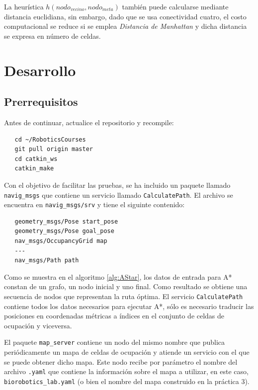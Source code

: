 \documentclass[letterpaper,12pt]{article}
\begin{document}
La heurística $h(nodo_{vecino}, nodo_{meta})$ también puede calcularse mediante distancia euclidiana, sin embargo, dado que se usa conectividad cuatro, el costo computacional se reduce si se emplea \textit{Distancia de Manhattan} y dicha distancia se expresa en número de celdas. 

\section{Desarrollo}

\subsection{Prerrequisitos}
Antes de continuar, actualice el repositorio y recompile:
\begin{verbatim}
   cd ~/RoboticsCourses
   git pull origin master
   cd catkin_ws
   catkin_make
\end{verbatim}

Con el objetivo de facilitar las pruebas, se ha incluido un paquete llamado \texttt{navig\_msgs} que contiene un servicio llamado \texttt{CalculatePath}. El archivo se encuentra en \texttt{navig\_msgs/srv} y tiene el siguinte contenido:
\begin{verbatim}
   geometry_msgs/Pose start_pose
   geometry_msgs/Pose goal_pose
   nav_msgs/OccupancyGrid map
   ---
   nav_msgs/Path path
\end{verbatim}
Como se muestra en el algoritmo \ref{alg:AStar}, los datos de entrada para A* constan de un grafo, un nodo inicial y uno final. Como resultado se obtiene una secuencia de nodos que representan la ruta óptima. El servicio \texttt{CalculatePath} contiene todos los datos necesarios para ejecutar A*, sólo es necesario traducir las posiciones en coordenadas métricas a índices en el conjunto de celdas de ocupación y viceversa. 

El paquete \texttt{map\_server} contiene un nodo del mismo nombre que publica periódicamente un mapa de celdas de ocupación y atiende un servicio con el que se puede obtener dicho mapa. Este nodo recibe por parámetro el nombre del archivo \texttt{.yaml} que contiene la información sobre el mapa a utilizar, en este caso, \texttt{biorobotics\_lab.yaml} (o bien el nombre del mapa construido en la práctica 3). 
\end{document}
